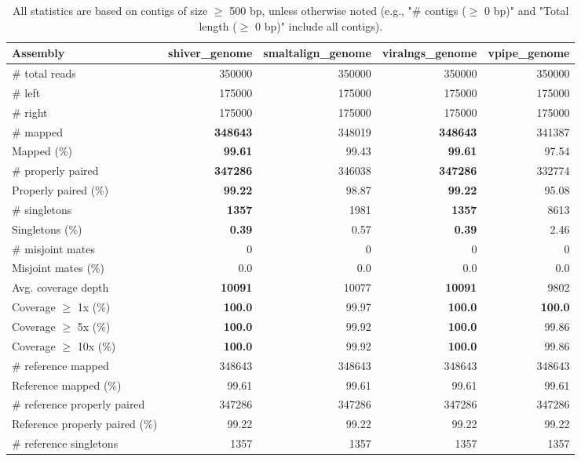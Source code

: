 \documentclass[12pt,a4paper]{article}
\begin{document}
\begin{table}[ht]
\begin{center}
\caption{All statistics are based on contigs of size $\geq$ 500 bp, unless otherwise noted (e.g., "\# contigs ($\geq$ 0 bp)" and "Total length ($\geq$ 0 bp)" include all contigs).}
\begin{tabular}{|l*{4}{|r}|}
\hline
Assembly & shiver\_genome & smaltalign\_genome & viralngs\_genome & vpipe\_genome \\ \hline
\# total reads & 350000 & 350000 & 350000 & 350000 \\ \hline
\# left & 175000 & 175000 & 175000 & 175000 \\ \hline
\# right & 175000 & 175000 & 175000 & 175000 \\ \hline
\# mapped & {\bf 348643} & 348019 & {\bf 348643} & 341387 \\ \hline
Mapped (\%) & {\bf 99.61} & 99.43 & {\bf 99.61} & 97.54 \\ \hline
\# properly paired & {\bf 347286} & 346038 & {\bf 347286} & 332774 \\ \hline
Properly paired (\%) & {\bf 99.22} & 98.87 & {\bf 99.22} & 95.08 \\ \hline
\# singletons & {\bf 1357} & 1981 & {\bf 1357} & 8613 \\ \hline
Singletons (\%) & {\bf 0.39} & 0.57 & {\bf 0.39} & 2.46 \\ \hline
\# misjoint mates & 0 & 0 & 0 & 0 \\ \hline
Misjoint mates (\%) & 0.0 & 0.0 & 0.0 & 0.0 \\ \hline
Avg. coverage depth & {\bf 10091} & 10077 & {\bf 10091} & 9802 \\ \hline
Coverage $\geq$ 1x (\%) & {\bf 100.0} & 99.97 & {\bf 100.0} & {\bf 100.0} \\ \hline
Coverage $\geq$ 5x (\%) & {\bf 100.0} & 99.92 & {\bf 100.0} & 99.86 \\ \hline
Coverage $\geq$ 10x (\%) & {\bf 100.0} & 99.92 & {\bf 100.0} & 99.86 \\ \hline
\# reference mapped & 348643 & 348643 & 348643 & 348643 \\ \hline
Reference mapped (\%) & 99.61 & 99.61 & 99.61 & 99.61 \\ \hline
\# reference properly paired & 347286 & 347286 & 347286 & 347286 \\ \hline
Reference properly paired (\%) & 99.22 & 99.22 & 99.22 & 99.22 \\ \hline
\# reference singletons & 1357 & 1357 & 1357 & 1357 \\ \hline

\end{tabular}
\end{center}
\end{table}
\end{document}
